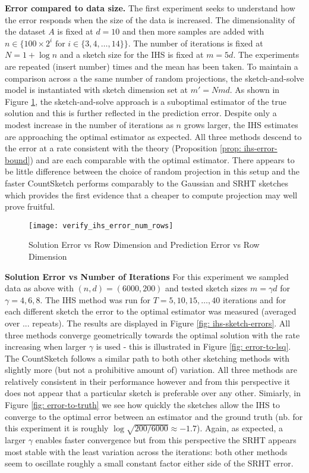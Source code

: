 \documentclass[twoside]{article}
\theoremstyle{definition}\newtheorem{thm}{Theorem}[section]
\theoremstyle{definition}\newtheorem{mydef}[thm]{Definition}
\theoremstyle{definition}\newtheorem{rem}[thm]{Remark}
\theoremstyle{definition}\newtheorem{prop}[thm]{Proposition}
\theoremstyle{definition}\newtheorem{example}[thm]{Example}
\theoremstyle{definition}\newtheorem{claim}[thm]{Claim}
\theoremstyle{definition}\newtheorem{Qu}[thm]{Question}
\theoremstyle{definition}\newtheorem{Lemma}[thm]{Lemma}
\theoremstyle{definition}\newtheorem{Cor}[thm]{Corollary}
\theoremstyle{definition}\newtheorem{Fact}[]{Fact}
\begin{document}
\textbf{Error compared to data size.}
The first experiment seeks to understand how the error responds when the size of
the data is increased.
The dimensionality of the dataset $A$ is fixed at $d=10$ and then more samples
are added with $n \in \{100 \times 2^i \text{ for } i \in \{3,4,\ldots,14\} \}$.
The number of iterations is fixed at $N=1+\log n$ and a sketch size for the IHS
is fixed at $m=5d$.
The experiments are repeated (insert number) times and the mean has been taken.
To maintain a comparison across a the same number of random projections, the
sketch-and-solve model is instantiated with sketch dimension set at $m'=Nmd$.
As shown in Figure \ref{fig: error-vs-row-dim}, the sketch-and-solve approach
is a suboptimal estimator of the true solution and this is further reflected in
the prediction error.
Despite only a modest increase in the number of iterations as $n$ grows larger,
the IHS estimates are approaching the optimal estimator as expected.
All three methods descend to the error at a rate consistent with the theory
(Proposition \ref{prop: ihs-error-bound}) and are each comparable with the
optimal estimator.
There appears to be little difference between the choice of random projection in
this setup and the faster CountSketch performs comparably to the Gaussian
 and
SRHT sketches which provides the first evidence that a cheaper to compute
projection may well prove fruitful.

\begin{figure}
  \centering
  \texttt{[image: verify\_ihs\_error\_num\_rows]}
  \caption{Solution Error vs Row Dimension and Prediction Error vs Row Dimension}
  \label{fig: error-vs-row-dim}
\end{figure}


\textbf{Solution Error vs Number of Iterations}
For this experiment we sampled data as above with $(n,d) = (6000,200)$
and tested sketch sizes $m = \gamma d$ for $\gamma = 4,6,8$.
The IHS method was run for $T=5,10,15, \ldots, 40$ iterations and for each
different sketch the error to the optimal estimator was measured (averaged
over ... repeats).
The results are displayed in Figure \ref{fig: ihs-sketch-errors}.
All three methods converge geometrically towards the optimal solution with
the rate increasing when larger $\gamma$ is used - this is illustrated in
Figure \ref{fig: error-to-lsq}.
The CountSketch follows a similar path to both other sketching methods
with slightly more (but not a prohibitive amount of) variation.
All three methods are relatively consistent in their performance however and
from this perspective it does not appear that a particular sketch is preferable
over any other.
Simiarly, in Figure \ref{fig: error-to-truth} we see how quickly the sketches
allow the IHS to converge to the optimal error between an estimator and the
ground truth (nb. for this experiment it is roughly $\log \sqrt{200/6000}
\approx -1.7$).
Again, as expected, a larger $\gamma$ enables faster convergence but from
this perspective the SRHT appears most stable with the least variation across
the iterations: both other methods seem to oscillate roughly a small constant
factor either side of the SRHT error.
\end{document}
